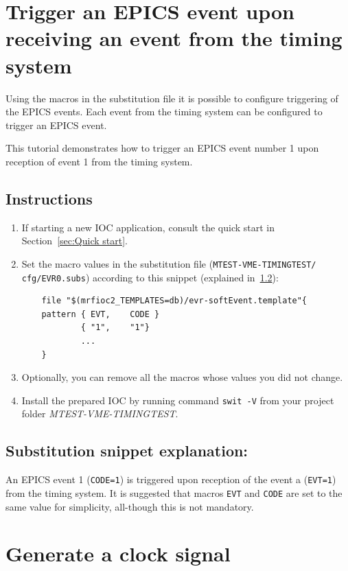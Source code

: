 \documentclass[12pt,a4paper]{article}
\begin{document}
	
\section{Trigger an EPICS event upon receiving an event from the timing system}
Using the macros in the substitution file it is possible to configure triggering of the EPICS events. Each event from the timing system can be configured to trigger an EPICS event.

This tutorial demonstrates how to trigger an EPICS event number 1 upon reception of event 1 from the timing system.

\subsection{Instructions}
\begin{enumerate}
	\item If starting a new IOC application, consult the quick start in Section~\ref{sec:Quick start}.
	
	\item Set the macro values in the substitution file (\texttt{MTEST-VME-TIMINGTEST/} \texttt{cfg/EVR0.subs}) according to this snippet (explained in~\ref{sec:explain_event}):
\begin{verbatim}
	file "$(mrfioc2_TEMPLATES=db)/evr-softEvent.template"{
	pattern { EVT,    CODE }
	        { "1",    "1"}
	        ...
	}
\end{verbatim}
	\item Optionally, you can remove all the macros whose values you did not change. 

	\item Install the prepared IOC by running command \texttt{swit -V} from your project folder \textit{MTEST-VME-TIMINGTEST}.
\end{enumerate}

\subsection{Substitution snippet explanation:}\label{sec:explain_event}
An EPICS event 1 (\texttt{CODE=1}) is triggered upon reception of the event a (\texttt{EVT=1}) from the timing system.
It is suggested that macros \texttt{EVT} and \texttt{CODE} are set to the same value for simplicity, all-though this is not mandatory.

\section{Generate a clock signal}
\end{document}
